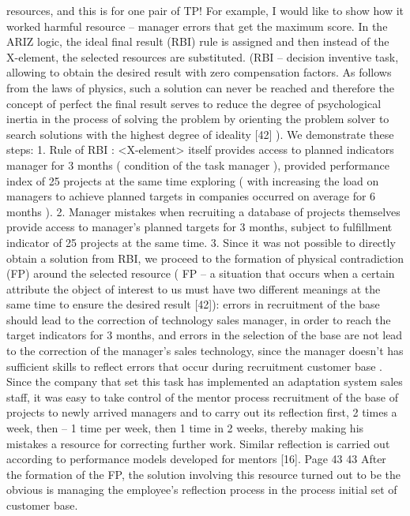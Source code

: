 resources, and this is for one pair of TP! For example, I would like to show how it worked
harmful resource -- manager errors that get the maximum score.
In the ARIZ logic, the ideal final result (RBI) rule is assigned and then
instead of the X-element, the selected resources are substituted. (RBI -- decision
inventive task, allowing to obtain the desired result with
zero compensation factors. As follows from the laws of physics, such
a solution can never be reached and therefore the concept of perfect
the final result serves to reduce the degree of psychological inertia in
the process of solving the problem by orienting the problem solver to search
solutions with the highest degree of ideality [42] ).
We demonstrate these steps:
1. Rule of RBI : <X-element> itself provides access to planned indicators
manager for 3 months ( condition of the task manager ), provided
performance index of 25 projects at the same time exploring ( with
increasing the load on managers to achieve planned targets in
companies occurred on average for 6 months ).
2. Manager mistakes when recruiting a database of projects themselves provide access to
manager's planned targets for 3 months, subject to fulfillment
indicator of 25 projects at the same time.
3. Since it was not possible to directly obtain a solution from RBI, we proceed to
the formation of physical contradiction (FP) around the selected resource
( FP -- a situation that occurs when a certain attribute
the object of interest to us must have two different meanings
at the same time to ensure the desired result [42]): errors in
recruitment of the base should lead to the correction of technology sales manager,
in order to reach the target indicators for 3 months, and errors in the selection of the base are not
lead to the correction of the manager’s sales technology, since the manager doesn’t
has sufficient skills to reflect errors that occur during recruitment
customer base .
Since the company that set this task has implemented an adaptation system
sales staff, it was easy to take control of the mentor process
recruitment of the base of projects to newly arrived managers and to carry out its reflection
first, 2 times a week, then -- 1 time per week, then 1 time in 2 weeks,
thereby making his mistakes a resource for correcting further work. Similar
reflection is carried out according to performance models developed for mentors
[16].
Page 43
43
After the formation of the FP, the solution involving this resource turned out to be
the obvious is managing the employee’s reflection process in the process
initial set of customer base.
